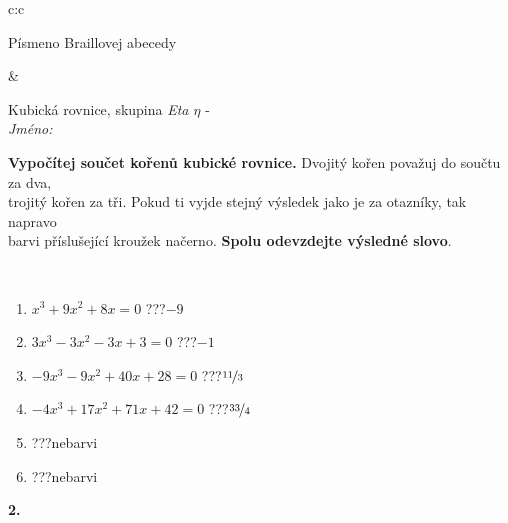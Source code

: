 \documentclass[10pt]{report}
\begin{document}
\begin{tabular}{c:c}
\begin{minipage}[c][104.5mm][t]{0.5\linewidth}
\begin{center}
\begin{minipage}{0.20\linewidth}
\begin{center}
{\small Písmeno Braillovej abecedy}
\end{center}
\end{minipage}
\end{center}
\end{minipage}
&
\begin{minipage}[c][104.5mm][t]{0.5\linewidth}
\begin{center}
\vspace{7mm}
{\huge Kubická rovnice, skupina \textit{Eta $\eta$} -}\\[5mm]
\textit{Jméno:}\phantom{xxxxxxxxxxxxxxxxxxxxxxxxxxxxxxxxxxxxxxxxxxxxxxxxxxxxxxxxxxxxxxxxx}\\[5mm]
\begin{minipage}{0.95\linewidth}
\begin{center}
\textbf{Vypočítej součet kořenů kubické rovnice.} Dvojitý kořen považuj do součtu za dva,\\trojitý kořen za tři. Pokud ti vyjde stejný výsledek jako je za otazníky, tak napravo\\barvi příslušející kroužek načerno. \textbf{Spolu odevzdejte výsledné slovo}.
\end{center}
\end{minipage}
\\[1mm]
\begin{minipage}{0.79\linewidth}
\begin{center}
\begin{varwidth}{\linewidth}
\begin{enumerate}
\Large
\item $x^3+9x^2+8x=0$\quad \dotfill\; ???\;\dotfill \quad $-9$
\item $3x^3-3x^2-3x+3=0$\quad \dotfill\; ???\;\dotfill \quad $-1$
\item $-9x^3-9x^2+40x+28=0$\quad \dotfill\; ???\;\dotfill \quad $\nicefrac{11}{3}$
\item $-4x^3+17x^2+71x+42=0$\quad \dotfill\; ???\;\dotfill \quad $\nicefrac{33}{4}$
\item \quad \dotfill\; ???\;\dotfill \quad nebarvi
\item \quad \dotfill\; ???\;\dotfill \quad nebarvi
\end{enumerate}
\end{varwidth}
\end{center}
\end{minipage}
\begin{minipage}{0.20\linewidth}
\begin{center}
{\Huge\bfseries 2.} \\[2mm]

\end{center}
\end{minipage}
\end{center}
\end{minipage}
\end{tabular}
\end{document}
